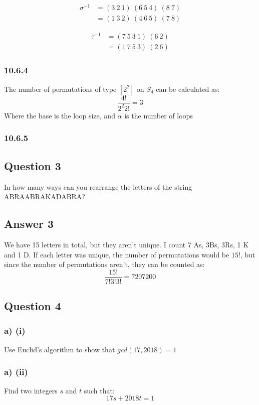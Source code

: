 \documentclass{article}
\begin{document}
	\[
	\begin{split}
	\sigma^{-1} & = (3 \ 2 \ 1) \ (6 \ 5 \ 4) \ (8 \ 7) \\
	& = (1 \ 3 \ 2) \ (4 \ 6 \ 5) \ (7 \ 8)
	\end{split}
	\]
	
	\[
	\begin{split}
	\tau^{-1} & = (7 \ 5 \ 3 \ 1) \ (6 \ 2) \\
	& = (1 \ 7 \ 5 \ 3) \ (2 \ 6)
	\end{split}
	\]
	
	\subsubsection*{10.6.4}
	The number of permutations of type $[2^2]$ on $S_4$ can be calculated as: 
	$$
	\frac{4!}{2^{2}2!} = 3
	$$
	Where the base is the loop size, and $\alpha$ is the number of loops
	
	\subsubsection*{10.6.5}
	
	\subsection*{Question 3}
	In how many ways can you rearrange the letters of the string
	ABRAABRAKADABRA?
	
	\subsection*{Answer 3}
	We have 15 letters in total, but they aren't unique. I count 7 As, 3Bs, 3Rs, 1 K and 1 D.
	If each letter was unique, the number of permutations would be $15!$, but since the number of permutations aren't, they can be counted as:
	$$
	\frac{15!}{7!3!3!} = 7207200
	$$
	
	\subsection*{Question 4}
	\subsubsection*{a) (i)}
	Use Euclid's algorithm to show that $gcd(17,2018)=1$
	\subsubsection*{a) (ii)}
	Find two integers $s$ and $t$ such that:
	$$
	17s+2018t=1
	$$
	
\end{document}
